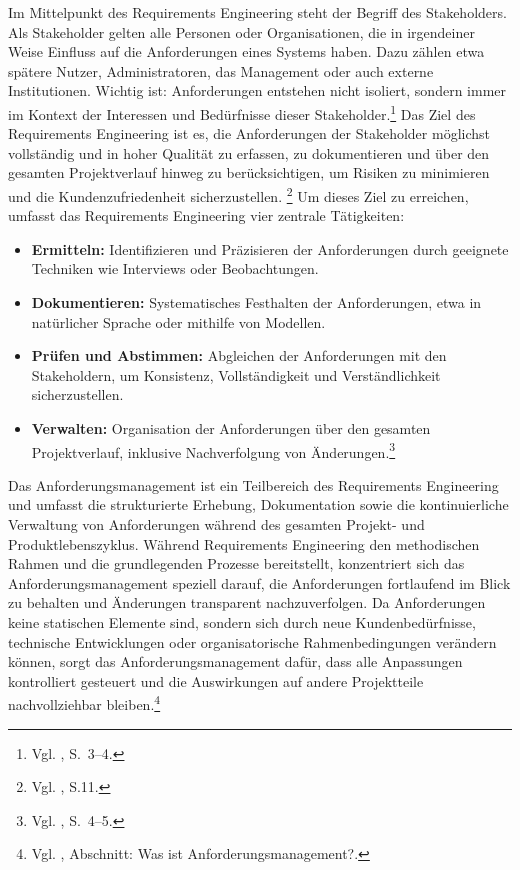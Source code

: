 \documentclass[
    12pt, 
    a4paper,
    ]{scrartcl} %
\begin{document}
Im Mittelpunkt des Requirements Engineering steht der Begriff des Stakeholders. Als Stakeholder gelten alle Personen oder Organisationen, die in irgendeiner Weise Einfluss auf die Anforderungen eines Systems haben. Dazu zählen etwa spätere Nutzer, Administratoren, das Management oder auch externe Institutionen. Wichtig ist: Anforderungen entstehen nicht isoliert, sondern immer im Kontext der Interessen und Bedürfnisse dieser Stakeholder.\footnote{Vgl. \cite{S_PohlRupp}, S.~3--4.}
Das Ziel des Requirements Engineering ist es, die Anforderungen der Stakeholder möglichst vollständig und in hoher Qualität zu erfassen, zu dokumentieren und über den gesamten Projektverlauf hinweg zu berücksichtigen, um Risiken zu minimieren und die Kundenzufriedenheit sicherzustellen. \footnote{Vgl. \cite{S_PohlRupp}, S.11.} 
Um dieses Ziel zu erreichen, umfasst das Requirements Engineering vier zentrale Tätigkeiten:
\begin{itemize}
    \item \textbf{Ermitteln:} Identifizieren und Präzisieren der Anforderungen durch geeignete Techniken wie Interviews oder Beobachtungen.
    \item \textbf{Dokumentieren:} Systematisches Festhalten der Anforderungen, etwa in natürlicher Sprache oder mithilfe von Modellen.
    \item \textbf{Prüfen und Abstimmen:} Abgleichen der Anforderungen mit den Stakeholdern, um Konsistenz, Vollständigkeit und Verständlichkeit sicherzustellen.
    \item \textbf{Verwalten:} Organisation der Anforderungen über den gesamten Projektverlauf, inklusive Nachverfolgung von Änderungen.\footnote{Vgl. \cite{S_PohlRupp}, S.~4--5.}
\end{itemize}
Das Anforderungsmanagement ist ein Teilbereich des Requirements Engineering und umfasst die strukturierte Erhebung, Dokumentation sowie die kontinuierliche Verwaltung von Anforderungen während des gesamten Projekt- und Produktlebenszyklus. Während Requirements Engineering den methodischen Rahmen und die grundlegenden Prozesse bereitstellt, konzentriert sich das Anforderungsmanagement speziell darauf, die Anforderungen fortlaufend im Blick zu behalten und Änderungen transparent nachzuverfolgen. Da Anforderungen keine statischen Elemente sind, sondern sich durch neue Kundenbedürfnisse, technische Entwicklungen oder organisatorische Rahmenbedingungen verändern können, sorgt das Anforderungsmanagement dafür, dass alle Anpassungen kontrolliert gesteuert und die Auswirkungen auf andere Projektteile nachvollziehbar bleiben.\footnote{Vgl. \cite{S_PMTools}, Abschnitt: Was ist Anforderungsmanagement?.}
\end{document}
